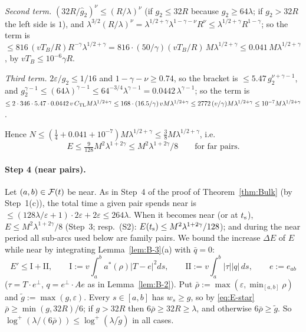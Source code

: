 \emph{Second term.} $(32R/\hat g_2)^\nu\le(R/\lambda)^\nu$ (if $g_2\le32R$ because $g_2\ge64\lambda$; if $g_2>32R$ the left side is
$1$), and $\lambda^{3/2}(R/\lambda)^\nu=\lambda^{1/2+\gamma}\lambda^{1-\gamma-\nu}R^\nu\le\lambda^{1/2+\gamma}R^{1-\gamma}$; so the
term is $\le816\,(vT_B/R)R^{-\gamma}\lambda^{1/2+\gamma}=816\cdot(50/\gamma)(vT_B/R)\,M\lambda^{1/2+\gamma}
\le0.041\,M\lambda^{1/2+\gamma}$, by $vT_B\le10^{-6}\gamma R$.

\emph{Third term.} $2\varepsilon/g_2\le1/16$ and $1-\gamma-\nu\ge0.74$, so the bracket is $\le5.47\,g_2^{\nu+\gamma-1}$, and
$g_2^{\gamma-1}\le(64\lambda)^{\gamma-1}\le64^{-3/4}\lambda^{\gamma-1}=0.0442\,\lambda^{\gamma-1}$; so the term is
$\le2\cdot346\cdot5.47\cdot0.0442\,v\,C_{\mathrm{TL}} M\lambda^{1/2+\gamma}\le168\cdot(16.5/\gamma)\,vM\lambda^{1/2+\gamma}
\le2772\,(v/\gamma)M\lambda^{1/2+\gamma}\le10^{-7}M\lambda^{1/2+\gamma}$.

Hence $N\le(\frac14+0.041+10^{-7})M\lambda^{1/2+\gamma}\le\frac38M\lambda^{1/2+\gamma}$, i.e.
\[
E\le\tfrac9{128}M^2\lambda^{1+2\gamma}\le M^2\lambda^{1+2\gamma}/8\qquad\text{for far pairs.}
\]

\paragraph{Step 4 (near pairs).}
Let $(a,b)\in\mathcal F(t)$ be near. As in Step~4 of the proof of Theorem~\ref{thm:Bulk} (by Step~1(c)), the total time a given pair spends
near is $\le(128\lambda/\varepsilon+1)\cdot2\varepsilon+2\varepsilon\le264\lambda$. When it becomes near (or at $t_{\mathrm s}$),
$E\le M^2\lambda^{1+2\gamma}/8$ (Step~3; resp.\ (S2): $E(t_{\mathrm s})\le M^2\lambda^{1+2\gamma}/128$); and during the near period all
sub-arcs used below are family pairs. We bound the increase $\Delta E$ of $E$ while near by integrating Lemma~\ref{lem:B-3}(a) with
$\bar q=0$:
\[
E'\le\mathrm I+\mathrm{II},\qquad\mathrm I:=v\int_a^ba^*(\rho)|T-e|^2ds,\qquad\mathrm{II}:=v\int_a^b|\tau||q|\,ds,\qquad e:=e_{ab}
\]
($\tau=T\cdot e^\perp$, $q=e^\perp\cdot Ae$ as in Lemma~\ref{lem:B-2}). Put $\bar\rho:=\max(\varepsilon,\min_{[a,b]}\rho)$ and
$\tilde g:=\max(g,\varepsilon)$. Every $s\in[a,b]$ has $w_s\ge g$, so by \eqref{eq:E-star} $\bar\rho\ge\min(g,32R)/6$; if
$g>32R$ then $6\bar\rho\ge32R\ge\lambda$, and otherwise $6\bar\rho\ge\tilde g$. So
$\log^+(\lambda/(6\bar\rho))\le\log^+(\lambda/\tilde g)$ in all cases.

